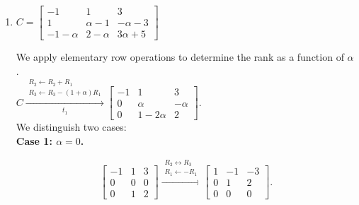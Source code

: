 \begin{enumerate}[label=\alph*)]
\begin{answer}
        The third pivot vanishes precisely when

        $$
        \alpha+5=0
        \iff \alpha=-5.
        $$

        Hence,

        $$
        \boxed{
        \operatorname{rank}(B)=
        \begin{cases}
            2, & \alpha=-5,\\
            3, & \alpha\neq-5.
        \end{cases}
        }
        $$
    \end{answer}


    \item
    $C=
    \begin{bmatrix}
        -1 & 1 & 3 \\
         1 & \alpha-1 & -\alpha-3 \\
        -1-\alpha & 2-\alpha & 3\alpha+5
    \end{bmatrix}
    $ \\[1.0em]

    \begin{answer}
        We apply elementary row operations
        to determine the rank as a function
        of $\alpha$. \\[1.0em]

        $C \xrightarrow[t_1]{
            \substack{
                R_2 \leftarrow R_2+R_1 \\
                R_3 \leftarrow R_3-(1+\alpha)R_1
            }
        }
        \begin{bmatrix}
            -1 & 1 & 3 \\
             0 & \alpha & -\alpha \\
             0 & 1-2\alpha & 2
        \end{bmatrix}.
        $ \\[1.0em]

        We distinguish two cases: \\[0.5em]

        \textbf{Case 1: $\alpha=0$.}

        $$
        \begin{bmatrix}
            -1 & 1 & 3 \\
             0 & 0 & 0 \\
             0 & 1 & 2
        \end{bmatrix}
        \xrightarrow{
            \substack{
                R_2 \leftrightarrow R_3 \\
                R_1 \leftarrow -R_1
            }
        }
        \begin{bmatrix}
            1 & -1 & -3 \\
            0 & 1 & 2 \\
            0 & 0 & 0
        \end{bmatrix}.
        $$


\end{answer}
\end{enumerate}
